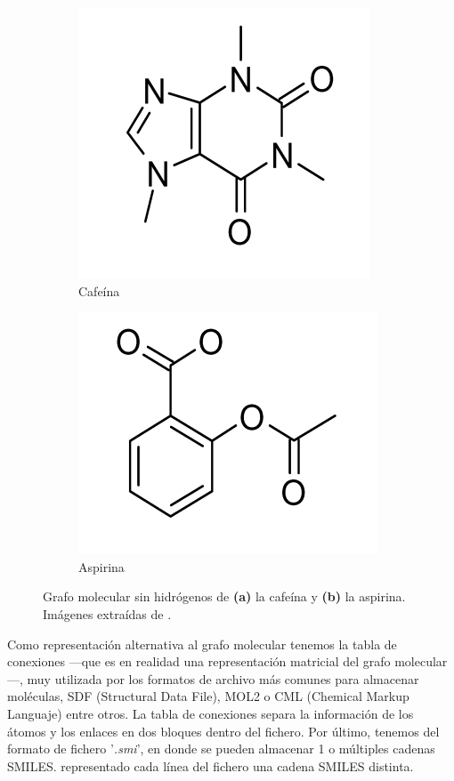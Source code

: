 \begin{figure}[h!]
\centering
\begin{subfigure}{.5\textwidth}
  \centering
  \includegraphics[width=.7\linewidth]{imagenes/estado_arte/teoria/cafeina.png}
  \caption{Cafeína}
\end{subfigure}%
\begin{subfigure}{.5\textwidth}
  \centering
  \includegraphics[width=.7\linewidth]{imagenes/estado_arte/teoria/aspirina.png}
  \caption{Aspirina}
\end{subfigure}
\caption{Grafo molecular sin hidrógenos de \textbf{(a)} la cafeína y \textbf{(b)} la aspirina. Imágenes extraídas de \cite{brown_chemoinformaticsintroduction_2009}.}
\label{fig:grafo_molecular_caf_asp}
\end{figure}


Como representación alternativa al grafo molecular tenemos la tabla de conexiones —que es en realidad una representación matricial del grafo molecular—, muy utilizada por los formatos de archivo más comunes para almacenar moléculas, SDF (Structural Data File), MOL2 o CML (Chemical Markup Languaje) entre otros. La tabla de conexiones separa la información de los átomos y los enlaces en dos bloques dentro del fichero. Por último, tenemos del formato de fichero '\textit{.smi}', en donde se pueden almacenar 1 o múltiples cadenas SMILES. representado cada línea del fichero una cadena SMILES distinta.

